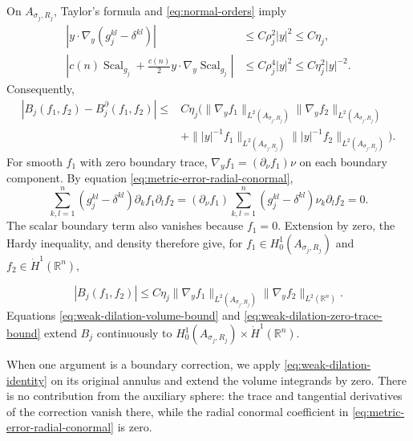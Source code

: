 \documentclass[11pt]{article}
\numberwithin{equation}{section}
\theoremstyle{remark}
\newcommand{\R}{\mathbb R}
\newcommand{\norm}[1]{\lVert #1\rVert}
\begin{document}
  On \(A_{\sigma_j,R_j}\), Taylor's formula and \eqref{eq:normal-orders} imply
\begin{equation}\label{eq:dilation-coefficient-bounds}
 \begin{aligned}
 |y\cdot\nabla_y(g_j^{kl}-\delta^{kl})|
 &\le C\rho_j^2|y|^2\le C\eta_j,\\
 \left|c(n)\operatorname{Scal}_{g_j}+\frac{c(n)}2y\cdot\nabla_y\operatorname{Scal}_{g_j}\right|
 &\le C\rho_j^4|y|^2\le C\eta_j^2|y|^{-2}.
 \end{aligned}
\end{equation}
Consequently,
\begin{equation}\label{eq:weak-dilation-volume-bound}
 \begin{aligned}
 | B_j(f_1,f_2)- B_j^\partial(f_1,f_2)|
 \le& C\eta_j\bigl(
 \norm{\nabla_yf_1}_{L^2(A_{\sigma_j,R_j})}
 \norm{\nabla_yf_2}_{L^2(A_{\sigma_j,R_j})}\\
 &+\norm{|y|^{-1}f_1}_{L^2(A_{\sigma_j,R_j})}
 \norm{|y|^{-1}f_2}_{L^2(A_{\sigma_j,R_j})}\bigr).
 \end{aligned}
\end{equation}
For smooth \(f_1\) with zero boundary trace,
\(\nabla_yf_1=(\partial_\nu f_1)\nu\) on each boundary component.
By equation  \eqref{eq:metric-error-radial-conormal},
\[
 \sum_{k,l=1}^n(g_j^{kl}-\delta^{kl})\partial_kf_1\partial_lf_2
 =(\partial_\nu f_1)\sum_{k,l=1}^n
 (g_j^{kl}-\delta^{kl})\nu_k\partial_lf_2=0.
\]
The scalar boundary term also vanishes because \(f_1=0\).
Extension by zero, the Hardy inequality, and density therefore give, for
\(f_1\in H_0^1(A_{\sigma_j,R_j})\) and \(f_2\in\dot H^1(\R^n)\),
 
\begin{equation}\label{eq:weak-dilation-zero-trace-bound}
 | B_j(f_1,f_2)|
 \le C\eta_j\norm{\nabla_yf_1}_{L^2(A_{\sigma_j,R_j})}
 \norm{\nabla_yf_2}_{L^2(\R^n)}.
\end{equation}
Equations  \eqref{eq:weak-dilation-volume-bound} and
\eqref{eq:weak-dilation-zero-trace-bound} extend
 \( B_j\) continuously to \(H_0^1(A_{\sigma_j,R_j})\times\dot H^1(\R^n)\).

When one argument is a boundary correction, we apply
\eqref{eq:weak-dilation-identity} on its original annulus and extend the
volume integrands by zero. There is no contribution from the auxiliary
sphere: the trace and tangential derivatives of the correction vanish
there, while the radial conormal coefficient in
\eqref{eq:metric-error-radial-conormal} is zero.
\end{document}

